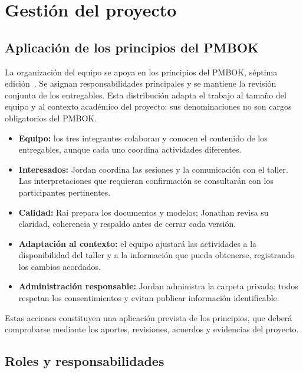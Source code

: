 \section{Gestión del proyecto}\label{sec:gestion}


\subsection{Aplicación de los principios del PMBOK}


La organización del equipo se apoya en los principios del PMBOK, séptima edición~\cite{pmbok2021}. Se asignan responsabilidades principales y se mantiene la revisión conjunta de los entregables. Esta distribución adapta el trabajo al tamaño del equipo y al contexto académico del proyecto; sus denominaciones no son cargos obligatorios del PMBOK.

\begin{itemize}
\item \textbf{Equipo:} los tres integrantes colaboran y conocen el contenido de los entregables, aunque cada uno coordina actividades diferentes.
\item \textbf{Interesados:} Jordan coordina las sesiones y la comunicación con el taller. Las interpretaciones que requieran confirmación se consultarán con los participantes pertinentes.
\item \textbf{Calidad:} Rai prepara los documentos y modelos; Jonathan revisa su claridad, coherencia y respaldo antes de cerrar cada versión.
\item \textbf{Adaptación al contexto:} el equipo ajustará las actividades a la disponibilidad del taller y a la información que pueda obtenerse, registrando los cambios acordados.
\item \textbf{Administración responsable:} Jordan administra la carpeta privada; todos respetan los consentimientos y evitan publicar información identificable.
\end{itemize}

Estas acciones constituyen una aplicación prevista de los principios, que deberá comprobarse mediante los aportes, revisiones, acuerdos y evidencias del proyecto.


\subsection{Roles y responsabilidades}


